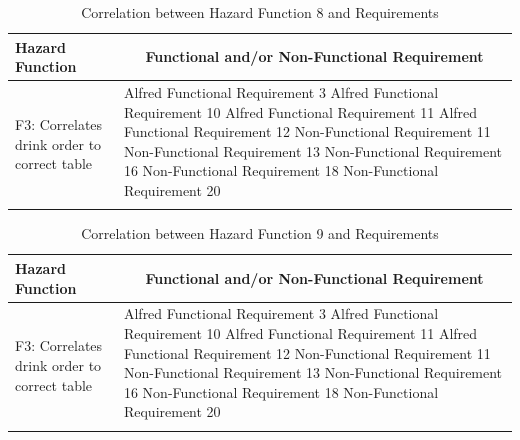 \documentclass [10pt]{article}
\begin{document}

\begin{longtable}{| p{ } | p{ } |}
\hline 
\centering \textbf{Hazard Function} & 
\multicolumn{1}{c}{\textbf {Functional and/or Non-Functional Requirement}}\\ \hline
\multirow{7}{*}{F3: Correlates drink order to correct table} & 
		{Alfred Functional Requirement 3 \newline
		Alfred Functional Requirement 10 \newline
		Alfred Functional Requirement 11 \newline
		Alfred Functional Requirement 12 \newline
		Non-Functional Requirement 11 \newline
		Non-Functional Requirement 13 \newline
		Non-Functional Requirement 16 \newline
		Non-Functional Requirement 18 \newline
		Non-Functional Requirement 20} \\ 
\hline 
\caption{Correlation between Hazard Function 8 and Requirements}  
\end{longtable}


\begin{longtable}{| p{ } | p{ } |}
\hline 
\centering \textbf{Hazard Function} & 
\multicolumn{1}{c}{\textbf {Functional and/or Non-Functional Requirement}}\\ \hline
\multirow{7}{*}{F3: Correlates drink order to correct table} & 
		{Alfred Functional Requirement 3 \newline
		Alfred Functional Requirement 10 \newline
		Alfred Functional Requirement 11 \newline
		Alfred Functional Requirement 12 \newline
		Non-Functional Requirement 11 \newline
		Non-Functional Requirement 13 \newline
		Non-Functional Requirement 16 \newline
		Non-Functional Requirement 18 \newline
		Non-Functional Requirement 20} \\ 
\hline 
\caption{Correlation between Hazard Function 9 and Requirements}  
\end{longtable}
\end{document}
